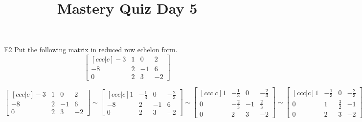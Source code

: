 \documentclass{sbgLAquiz}
\title{Mastery Quiz Day 5 }
\begin{document}
\begin{problem}{E2}
Put the following matrix in reduced row echelon form.
$$\begin{bmatrix}[ccc|c] -3 & 1 & 0 & 2 \\ -8 & 2 & -1 & 6 \\ 0 & 2 & 3 & -2 \end{bmatrix}$$
\end{problem}
\begin{solution}
$$\begin{bmatrix}[ccc|c] 
-3 & 1 & 0 & 2 \\
 -8 & 2 & -1 & 6 \\
 0 & 2 & 3 & -2 
\end{bmatrix} \sim
\begin{bmatrix}[ccc|c] 
1 & -\frac{1}{3} & 0 & -\frac{2}{3} \\
 -8 & 2 & -1 & 6 \\
 0 & 2 & 3 & -2 
\end{bmatrix} \sim
\begin{bmatrix}[ccc|c] 
1 & -\frac{1}{3} & 0 & -\frac{2}{3} \\
 0 & -\frac{2}{3} & -1 & \frac{2}{3} \\
 0 & 2 & 3 & -2 
\end{bmatrix} \sim
\begin{bmatrix}[ccc|c] 
1 & -\frac{1}{3} & 0 & -\frac{2}{3} \\
 0 & 1 & \frac{3}{2} & -1 \\
 0 & 2 & 3 & -2 
\end{bmatrix} \sim
\begin{bmatrix}[ccc|c] 
1 & 0 & \frac{1}{2} & -1 \\
 0 & 1 & \frac{3}{2} & -1 \\
 0 & 0 & 0 & 0 
\end{bmatrix}$$
\end{solution}
\end{document}
